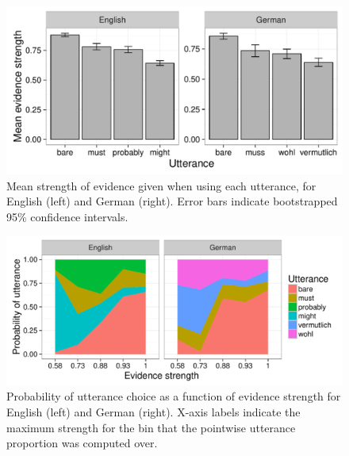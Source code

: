 \documentclass[11pt]{article}
\begin{document}
\begin{figure}
\centering
\includegraphics[width=.9\textwidth]{pics/mean-production-evidence}\caption{Mean strength of evidence given when using each utterance, for English (left) and German (right). Error bars indicate bootstrapped 95\% confidence intervals.}
\label{fig:utterances-estrength}
\end{figure}

\begin{figure}
\centering
\includegraphics[width=\textwidth]{pics/production-by-strength}\caption{Probability of utterance choice as a function of evidence strength for English (left) and German (right). X-axis labels indicate the maximum strength for the bin that the pointwise utterance proportion was computed over.}
\label{fig:utterances-by-strength}
\end{figure}
\end{document}
